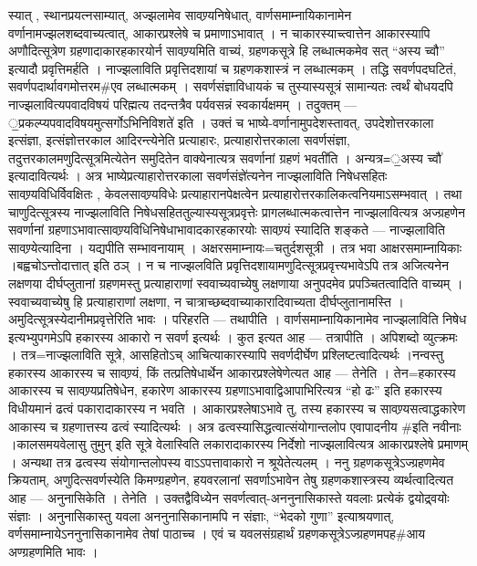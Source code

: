 स्यात् , स्थानप्रयत्नसाम्यात्, अज्झलामेव सावण्र्यनिषेधात्,
वार्णसमाम्नायिकानामेन वर्णानामज्झलशब्दवाच्यत्वात्, आकारप्रश्लेषे च
प्रमाणाऽभावात् । न चाकारस्याच्त्वात्तेन आकारस्यापि अणौदित्सूत्रेण
ग्रहणादाकारहकारयोर्न सावण्र्यमिति वाच्यं, ग्रहणकसूत्रे हि लब्धात्मकमेव
सत् ``अस्य च्वौ'' इत्यादौ प्रवृत्तिमर्हति । नाज्झलाविति प्रवृत्तिदशायां
च ग्रहणकशास्त्रं न लब्धात्मकम् । तद्धि सवर्णपदघटितं,
सवर्णपदार्थावगमोत्तरम\#एव लब्धात्मकम् । सवर्णसंज्ञाविधायकं च
तुस्यास्यसूत्रं सामान्यतः त्वर्थं बोधयदपि नाज्झलावित्यपवादविषयं
परिह्मत्य तदन्तत्रैव पर्यवसन्नं स्वकार्यक्षमम् । तदुक्तम् ---
॒प्रकल्प्यपवादविषयमुत्सर्गोऽभिनिविशते॑ इति । उक्तं च
भाष्ये-वर्णानामुपदेशस्तावत्, उपदेशोत्तरकाला इत्संज्ञा, इत्संज्ञोत्तरकाल
आदिरन्त्येनेति प्रत्याहारः, प्रत्याहारोत्तरकाला सवर्णसंज्ञा,
तदुत्तरकालमणुदित्सूत्रमित्येतेन समुदितेन वाक्येनात्यत्र सवर्णानां ग्रहणं
भवती॑ति । अन्यत्र=॒अस्य च्वौ॑ इत्यादावित्यर्थः । अत्र
भाष्येप्रत्याहारोत्तरकाला सवर्णसंज्ञे॑त्यनेन नाज्झलाविति निषेधसहितः
सावण्र्यविधिर्विवक्षितः , केवलसावण्र्यविधेः प्रत्याहारानपेक्षत्वेन
प्रत्याहारोत्तरकालिकत्वनियमाऽसम्भवात् । तथा चाणुदित्सूत्रस्य नाज्झलाविति
निषेधसहिततुल्यास्यसूत्रप्रवृत्तेः प्रागलब्धात्मकत्वात्तेन
नाज्झलावित्यत्र अज्ग्रहणेन सवर्णानां
ग्रहणाऽभावात्सावण्र्यविधिनिषेधाभावादकारहकारयोः सावण्र्यं स्यादिति शङ्कते
--- नाज्झलाविति सावण्र्येत्यादिना । यद्यपीति सम्भावनायाम् ।
अक्षरसमाम्नायः=चतुर्दशसूत्री । तत्र भवा आक्षरसमाम्नायिकाः
।बह्वचोऽन्तोदात्तात् इति ठञ् । न च नाज्झलविति
प्रवृत्तिदशायामणुदित्सूत्रप्रवृत्त्यभावेऽपि तत्र अजित्यनेन लक्षणया
दीर्घप्लुतानां ग्रहणमस्तु प्रत्याहाराणां स्ववाच्यवाच्येषु लक्षणाया
अनुपदमेव प्रपञ्चितत्वादिति वाच्यम् । स्ववाच्यवाच्येषु हि प्रत्याहाराणां
लक्षणा, न चात्राच्छब्दवाच्याकारादिवाच्यता दीर्घप्लुतानामस्ति ।
अमुदित्सूत्रस्येदानीमप्रवृत्तेरिति भावः । परिहरति --- तथापीति ।
वार्णसमाम्नायिकानामेव नाज्झलाविति निषेध इत्यभ्युपगमेऽपि हकारस्य आकारो न
सवर्ण इत्यर्थः । कुत इत्यत आह --- तत्रापीति । अपिशब्दो व्युत्क्रमः ।
तत्र=नाज्झलाविति सूत्रे, आसहितोऽच् आचित्याकारस्यापि सवर्णदीर्घेण
प्रश्लिष्टत्वादित्यर्थः ।नन्वस्तु हकारस्य आकारस्य च सावण्र्यं, किं
तत्प्रतिषेधार्थेन आकारप्रश्लेषेणेत्यत आह --- तेनेति । तेन=हकारस्य
आकारस्य च सावण्र्यप्रतिषेधेन, हकारेण आकारस्य
ग्रहणाऽभावाद्विआपाभिरित्यत्र ``हो ढः'' इति हकारस्य विधीयमानं ढत्वं
पकारादाकारस्य न भवति । आकारप्रश्लेषाऽभावे तु, तस्य हकारस्य च
सावण्र्यसत्वाद्धकारेण आकास्य च ग्रहणात्तस्य ढत्वं स्यादित्यर्थः । अत्र
ढत्वस्यासिद्धत्वात्संयोगान्तलोप एवापादनीय \#इति नवीनाः ।कालसमयवेलासु
तुमुन् इति सूत्रे वेलास्विति लकारादाकारस्य निर्देशो नाज्झलावित्यत्र
आकारप्रश्लेषे प्रमाणम् । अन्यथा तत्र ढत्वस्य संयोगान्तलोपस्य
वाऽ‌ऽपत्तावाकारो न श्रूयेतेत्यलम् । ननु ग्रहणकसूत्रेऽज्ग्रहणमेव
क्रियताम्, अणुदित्सवर्णस्येति किमण्ग्रहणेन, हयवरलानां सवर्णाऽभावेन तेषु
ग्रहणकशास्त्रस्य व्यर्थत्वादित्यत आह --- अनुनासिकेति । तेनेति ।
उक्तद्वैविध्येन सवर्णत्वात्-अननुनासिकास्ते यवलाः प्रत्येकं द्वयोद्र्वयोः
संज्ञाः । अनुनासिकास्तु यवला अननुनासिकानामपि न संज्ञाः, ``भेदको गुणा''
इत्याश्रयणात्, वर्णसमाम्नायेऽननुनासिकानामेव तेषां पाठाच्च । एवं च
यवलसंग्रहार्थं ग्रहणकसूत्रेऽज्ग्रहणमपह\#आय अण्ग्रहणमिति भावः ।
